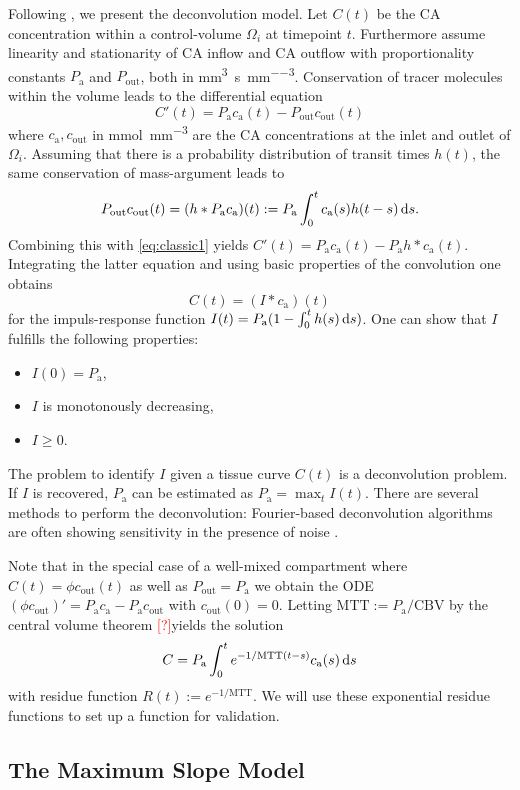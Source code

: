 \documentclass[paper=a4, fontsize=12pt,parskip=half,headings=small]{scrartcl}
\newcommand{\ca}{c_\mathrm{a}}
\newcommand{\CBV}{\mathrm{CBV}}
\newcommand{\MTT}{\mathrm{MTT}}
\newcommand{\cout}{c_{\mathrm{out}}}
\newcommand{\Pa}{P_{\mathrm{a}}}
\newcommand{\Pout}{P_{\mathrm{out}}}
\newcommand{\siP}{\cubic\milli\meter\per\second\per\cubic\milli\meter}
\newcommand{\sic}{\milli\mol\per\cubic\milli\meter}
\newcommand{\missingsource}{\textcolor{red}{[?]}}
\begin{document}
	Following \cite{sourbron13}, we present the deconvolution model.
	Let $C(t)$ be the CA concentration within a control-volume $\Omega_i$ at timepoint $t$.
	Furthermore assume linearity and stationarity of CA inflow and CA outflow with proportionality constants $\Pa$ and $\Pout$, both in \si{\siP}.
	Conservation of tracer molecules within the volume leads to the differential equation 
	\begin{equation}
		C'(t) = \Pa\ca(t) - \Pout\cout(t)
		\label{eq:classic1}
	\end{equation}
	where $\ca,\cout$ in \si{\sic} are the CA concentrations at the inlet and outlet of $\Omega_i$.
	Assuming that there is a probability distribution of transit times $h(t)$, the same conservation of mass-argument leads to
	\[
		\Pout\cout(t) = (h*\Pa\ca)(t) := \Pa\int_0^t \ca(s) h(t-s) \diffint s.
	\]
	Combining this with \eqref{eq:classic1} yields $C'(t) = \Pa\ca(t)-\Pa h*\ca(t)$.
	Integrating the latter equation and using basic properties of the convolution one obtains
	\[
		C(t) = (I*\ca)(t)
	\]
	for the impuls-response function $I(t) = \Pa(1-\int_0^t h(s) \diffint s)$.
	One can show that $I$ fulfills the following properties:
	\begin{itemize}
		\item $I(0) = \Pa$,
		\item $I$ is monotonously decreasing,
		\item $I\ge 0$.		
	\end{itemize}
	
	The problem to identify $I$ given a tissue curve $C(t)$ is a deconvolution problem.
	If $I$ is recovered, $\Pa$ can be estimated as $\Pa = \max_{t} I(t)$.
	There are several methods to perform the deconvolution:
	Fourier-based deconvolution algorithms are often showing sensitivity in the presence of noise  \cite{wirestam00}. 
	
	
	
	Note that in the special case of a well-mixed compartment where $C(t) = \phi\cout(t)$ as well as $\Pout=\Pa$ we obtain the ODE $(\phi \cout)' = \Pa \ca - \Pa \cout$ with $\cout(0)=0$.
	Letting $\MTT:=\Pa/\CBV$ by the central volume theorem \missingsource yields the solution
	\[
		C = \Pa \int_0^t e^{-1/\MTT(t-s)}\ca(s)\diffint s
	\]
	with residue function $R(t):=e^{-1/\MTT}$. 
	We will use these exponential residue functions to set up a function for validation.	
	

	\subsection{The Maximum Slope Model}\label{sec:ms}


		
	

	
\end{document}
